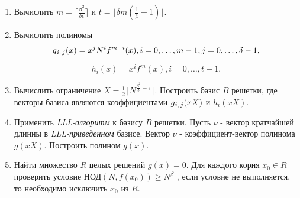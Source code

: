     \begin{enumerate}
      \item Вычислить {$m = \lceil \frac{\beta^2}{\delta \epsilon} \rceil$} и {$t = \lfloor \delta m (\frac{1}{\beta} - 1) \rfloor$}.
      \item Вычислить полиномы
	\begin{equation}
	   g\textsubscript{{$i,j$}}(x) = x^j N^i f^{m-i}(x), i=0, \dots, m-1, j=0, \dots, \delta-1,
	\end{equation}
	
	\begin{equation}
	   h_i(x) = x^i f^m(x), i = 0, \dots, t-1.
	\end{equation}
	
      \item Вычислить ограничение {$X = \frac{1}{2} \lceil N^{\frac{\beta^2}{\delta} - \epsilon} \rceil$}. Построить базис {$B$} решетки,
	где векторы базиса являются коэффициентами {$g\textsubscript{{$i,j$}}(x X)$} и {$h_i(x X)$}.
      \item Применить \textit{LLL-алгоритм} к базису {$B$} решетки. Пусть {$\nu$} - вектор кратчайшей длинны в \textit{LLL-приведенном} базисе. Вектор {$\nu$} - коэффициент-вектор полинома {$g(xX)$}. Построить полином {$g(x)$}.
      \item Найти множество {$R$} целых решений {$g(x) = 0$}. Для каждого корня {$x_0 \in R$} проверить условие НОД{$(N, f(x_0)) \ge N^\beta$}
      , если условие не выполняется, то необходимо исключить {$x_0$} из {$R$}.
    \end{enumerate}    